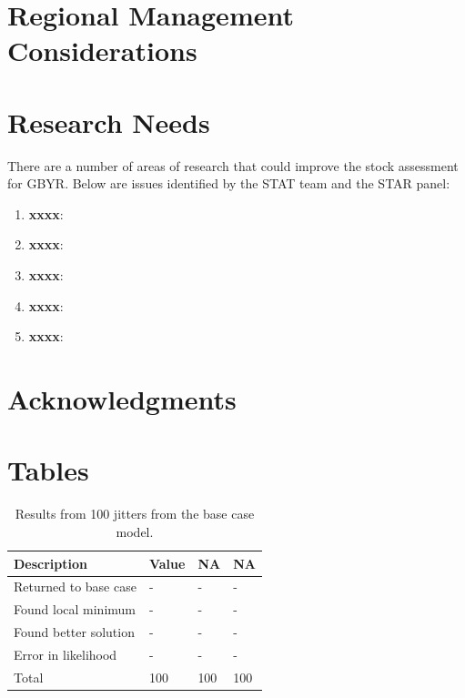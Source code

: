 \documentclass[12pt,]{article}
\begin{document}
\section{Regional Management
Considerations}\label{regional-management-considerations}

\section{Research Needs}\label{research-needs}

There are a number of areas of research that could improve the stock
assessment for GBYR. Below are issues identified by the STAT team and
the STAR panel:

\begin{enumerate}

\item \textbf{xxxx}: 

\item \textbf{xxxx}:

\item \textbf{xxxx}:

\item \textbf{xxxx}:

\item \textbf{xxxx}:

\end{enumerate}

\section{Acknowledgments}\label{acknowledgments}

\newpage

\FloatBarrier

\section{Tables}\label{tables}

\FloatBarrier

\begin{table}[ht]
\centering
\caption{Results from 100 jitters from the base 
                                      case model.} 
\label{tab:jitter}
\begin{tabular}{llll}
  \hline
Description & Value & NA & NA \\ 
  \hline
Returned to base case & - & - & - \\ 
  Found local minimum & - & - & - \\ 
  Found better solution & - & - & - \\ 
  Error in likelihood & - & - & - \\ 
  Total & 100 & 100 & 100 \\ 
   \hline
\end{tabular}
\end{table}
\end{document}
